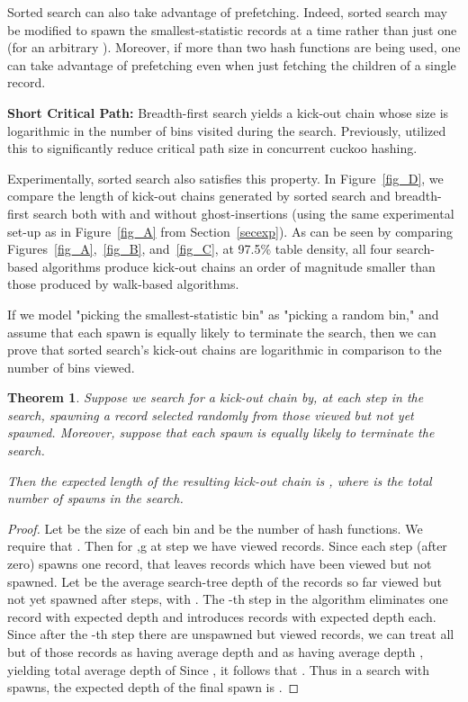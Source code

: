 \documentclass{sig-alternate-05-2015}
\newtheorem{thm}{Theorem}[section]
\begin{document}
Sorted search can also take advantage of prefetching. Indeed, sorted
search may be modified to spawn the  smallest-statistic records at
a time rather than just one (for an arbitrary ). Moreover, if more
than two hash functions are being used, one can take advantage of
prefetching even when just fetching the children of a single record.

\textbf{Short Critical Path:} Breadth-first search yields a kick-out
chain whose size is logarithmic in the number of bins visited
during the search. Previously, \cite{li14} utilized this to
significantly reduce critical path size in concurrent cuckoo hashing.

Experimentally, sorted search also satisfies this property. In
Figure~\ref{fig_D}, we compare the length of kick-out chains generated
by sorted search and breadth-first search both with and without
ghost-insertions (using the same experimental set-up as in
Figure~\ref{fig_A} from Section~\ref{secexp}). As can be seen by
comparing Figures~\ref{fig_A},~\ref{fig_B}, and~\ref{fig_C}, at 97.5\%
table density, all four search-based algorithms produce kick-out
chains an order of magnitude smaller than those produced by walk-based
algorithms.


If we model "picking the smallest-statistic bin" as "picking a random
bin," and assume that each spawn is equally likely to terminate the
search, then we can prove that sorted search's kick-out chains are
logarithmic in comparison to the number of bins viewed.

\begin{thm}
Suppose we search for a kick-out chain by, at each step in the search,
spawning a record selected randomly from those viewed but not yet
spawned. Moreover, suppose that each spawn is equally likely to
terminate the search.
  
Then the expected length of the resulting kick-out chain is , where  is the total number of spawns in the search.
\end{thm}
\begin{proof}
Let  be the size of each bin and  be the number of hash
functions. We require that . Then for ,g at step
 we have viewed  records. Since each step (after
zero) spawns one record, that leaves  records which
have been viewed but not spawned. Let  be the average
search-tree depth of the records so far viewed but not yet spawned
after  steps, with . The -th step in the algorithm
eliminates one record with expected depth  and introduces
 records with expected depth  each. Since after the
-th step there are  unspawned but viewed records,
we can treat all but  of those records as having average depth
 and  as having average depth , yielding
total average depth of   Since , it follows that . Thus in a search with  spawns, the expected depth of the
final spawn is .
\end{proof}
\end{document}
